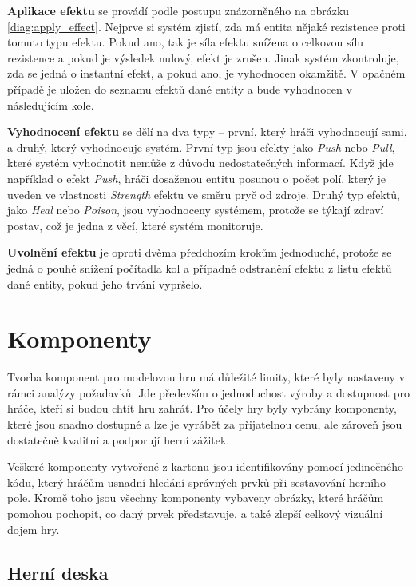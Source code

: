 \textbf{Aplikace efektu} se provádí podle postupu znázorněného na obrázku \ref{diag:apply_effect}. Nejprve si systém zjistí, zda má entita nějaké rezistence proti tomuto typu efektu. Pokud ano, tak je síla efektu snížena o celkovou sílu rezistence a pokud je výsledek nulový, efekt je zrušen. Jinak systém zkontroluje, zda se jedná o instantní efekt, a pokud ano, je vyhodnocen okamžitě. V opačném případě je uložen do seznamu efektů dané entity a bude vyhodnocen v následujícím kole.

\textbf{Vyhodnocení efektu} se dělí na dva typy -- první, který hráči vyhodnocují sami, a druhý, který vyhodnocuje systém. První typ jsou efekty jako \textit{Push} nebo \textit{Pull}, které systém vyhodnotit nemůže z důvodu nedostatečných informací. Když jde například o efekt \textit{Push}, hráči dosaženou entitu posunou o počet polí, který je uveden ve vlastnosti \textit{Strength} efektu ve směru pryč od zdroje. Druhý typ efektů, jako \textit{Heal} nebo \textit{Poison}, jsou vyhodnoceny systémem, protože se týkají zdraví postav, což je jedna z věcí, které systém monitoruje.

\textbf{Uvolnění efektu} je oproti dvěma předchozím krokům jednoduché, protože se jedná o pouhé snížení počítadla kol a případné odstranění efektu z listu efektů dané entity, pokud jeho trvání vypršelo.


\section{Komponenty}
\label{sec:design_components}

Tvorba komponent pro modelovou hru má důležité limity, které byly nastaveny v rámci analýzy požadavků. Jde především o jednoduchost výroby a dostupnost pro hráče, kteří si budou chtít hru zahrát. Pro účely hry byly vybrány komponenty, které jsou snadno dostupné a lze je vyrábět za přijatelnou cenu, ale zároveň jsou dostatečně kvalitní a podporují herní zážitek.

Veškeré komponenty vytvořené z kartonu jsou identifikovány pomocí jedinečného kódu, který hráčům usnadní hledání správných prvků při sestavování herního pole. Kromě toho jsou všechny komponenty vybaveny obrázky, které hráčům pomohou pochopit, co daný prvek představuje, a také zlepší celkový vizuální dojem hry.

\subsection{Herní deska}
\label{subsec:design_board}

